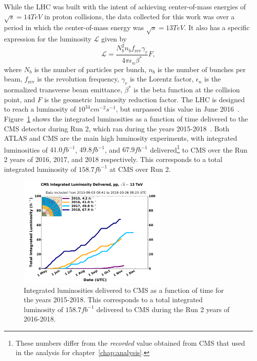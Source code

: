 While the LHC was built with the intent of achieving center-of-mass energies of $\sqrt{s}=14\unit{TeV}$ in proton collisions, the data collected for this work was over a period in which the center-of-mass energy was $\sqrt{s}=13\unit{TeV}$.
It also has a specific expression for the luminosity $\mathcal{L}$ given by
\begin{equation}
  \mathcal{L}=\frac{N_b^2n_bf_\mathrm{rev}\gamma_r}{4\pi\epsilon_n\beta^*}F,
\end{equation}
where $N_b$ is the number of particles per bunch, $n_b$ is the number of bunches per beam, $f_\mathrm{rev}$ is the revolution frequency, $\gamma_r$ is the Lorentz factor, $\epsilon_n$ is the normalized transverse beam emittance, $\beta^*$ is the beta function at the collision point, and $F$ is the geometric luminosity reduction factor.
The LHC is designed to reach a luminosity of $10^{34}\unit{cm^{-2}s^{-1}}$, but surpassed this value in June 2016~\cite{LHClumi}.
Figure~\ref{fig:CMSlumi} shows the integrated luminosities as a function of time delivered to the CMS detector during Run 2, which ran during the years 2015-2018~\cite{CMSlumi}.
Both ATLAS and CMS are the main high luminosity experiments, with integrated luminosities of $41.0\unit{fb^{-1}}$, $49.8\unit{fb^{-1}}$, and $67.9\unit{fb^{-1}}$ delivered\footnote{These numbers differ from the \emph{recorded} value obtained from CMS that used in the analysis for chapter~\ref{chap:analysis}.} to CMS over the Run 2 years of 2016, 2017, and 2018 respectively.
This corresponds to a total integrated luminosity of $158.7\unit{fb^{-1}}$ at CMS over Run 2.


\begin{figure}[htbp]
  \centering
  \includegraphics[width=0.65\textwidth]{fig/experiment/int_lumi_cumulative_pp_2_run2.pdf}
  \caption{
    Integrated luminosities delivered to CMS as a function of time for the years 2015-2018.
    This corresponds to a total integrated luminosity of $158.7\unit{fb^{-1}}$ delivered to CMS during the Run 2 years of 2016-2018.
  }
  \label{fig:CMSlumi}
\end{figure}

